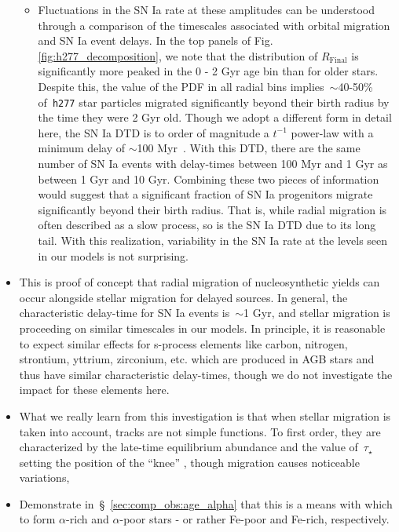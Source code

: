 \documentclass[fleqn, usenatbib]{mnras}
\begin{document}
\begin{itemize}
\begin{itemize}
		\item Fluctuations in the SN Ia rate at these amplitudes can be 
		understood through a comparison of the timescales associated with 
		orbital migration and SN Ia event delays. In the top panels of Fig. 
		\ref{fig:h277_decomposition}, we note that the distribution of 
		$R_\text{Final}$ is significantly more peaked in the 0 - 2 Gyr age bin 
		than for older stars. Despite this, the value of the PDF in all radial 
		bins implies~$\sim$40-50\% of~\texttt{h277} star particles migrated 
		significantly beyond their birth radius by the time they were 2 Gyr 
		old. Though we adopt a different form in detail here, the SN Ia DTD is 
		to order of magnitude a $t^{-1}$ power-law with a minimum delay of 
		$\sim$100 Myr~\citep{Maoz2012, Maoz2017}. With this DTD, there are the 
		same number of SN Ia events with delay-times between 100 Myr and 1 Gyr 
		as between 1 Gyr and 10 Gyr. Combining these two pieces of information 
		would suggest that a significant fraction of SN Ia progenitors migrate 
		significantly beyond their birth radius. That is, while radial 
		migration is often described as a slow process, so is the SN Ia DTD due 
		to its long tail. With this realization, variability in the SN Ia rate 
		at the levels seen in our models is not surprising. 
	\end{itemize} 

	\item This is proof of concept that radial migration of nucleosynthetic 
	yields can occur alongside stellar migration for delayed sources. In 
	general, the characteristic delay-time for SN Ia events is~$\sim$1 Gyr, and 
	stellar migration is proceeding on similar timescales in our models. In 
	principle, it is reasonable to expect similar effects for s-process 
	elements like carbon, nitrogen, strontium, yttrium, zirconium, etc. which 
	are produced in AGB stars and thus have similar characteristic delay-times, 
	though we do not investigate the impact for these elements here. 

	\item What we really learn from this investigation is that when stellar 
	migration is taken into account, tracks are not simple functions. To first 
	order, they are characterized by the late-time equilibrium abundance and 
	the value of~$\tau_\star$ setting the position of the ``knee'' 
	\citep{Weinberg2017}, though migration causes noticeable variations, 

	\item Demonstrate in~\S~\ref{sec:comp_obs:age_alpha} that this is a means 
	with which to form $\alpha$-rich and $\alpha$-poor stars - or rather 
	Fe-poor and Fe-rich, respectively. 
\end{itemize} 
\end{document}
